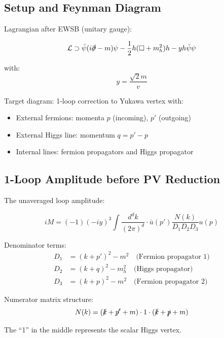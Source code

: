 \documentclass[12pt,a4paper]{article}
\theoremstyle{definition}
\begin{document}
	\subsection{Setup and Feynman Diagram}
	
	Lagrangian after EWSB (unitary gauge):
	
	\begin{equation}
		\mathcal{L} \supset \bar{\psi}(i\slashed{\partial} - m)\psi - \frac{1}{2}h(\Box + m_h^2)h - y h \bar{\psi}\psi
	\end{equation}
	
	with:
	\begin{equation}
		y = \frac{\sqrt{2} m}{v}
	\end{equation}
	
	Target diagram: 1-loop correction to Yukawa vertex with:
	\begin{itemize}
		\item External fermions: momenta $p$ (incoming), $p'$ (outgoing)
		\item External Higgs line: momentum $q = p' - p$
		\item Internal lines: fermion propagators and Higgs propagator
	\end{itemize}
	
	\subsection{1-Loop Amplitude before PV Reduction}
	
	The unaveraged loop amplitude:
	
	\begin{equation}
		iM = (-1)(-iy)^3 \int \frac{d^d k}{(2\pi)^d} \cdot \bar{u}(p') \frac{N(k)}{D_1 D_2 D_3} u(p)
	\end{equation}
	
	Denominator terms:
	\begin{align}
		D_1 &= (k + p')^2 - m^2 \quad \text{(Fermion propagator 1)}\\
		D_2 &= (k + q)^2 - m_h^2 \quad \text{(Higgs propagator)}\\
		D_3 &= (k + p)^2 - m^2 \quad \text{(Fermion propagator 2)}
	\end{align}
	
	Numerator matrix structure:
	\begin{equation}
		N(k) = (\slashed{k} + \slashed{p'} + m) \cdot 1 \cdot (\slashed{k} + \slashed{p} + m)
	\end{equation}
	
	The ``1'' in the middle represents the scalar Higgs vertex.
	
\end{document}
